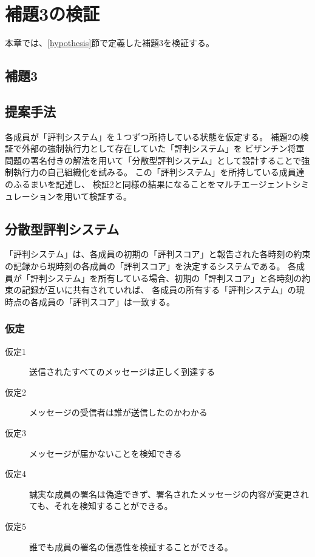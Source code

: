 \chapter{補題3の検証}
本章では、\ref{hypothesis}節で定義した補題3を検証する。

\section{補題3}
\thirdLemma

\section{提案手法}
各成員が「評判システム」を１つずつ所持している状態を仮定する。
補題2の検証で外部の強制執行力として存在していた「評判システム」を
ビザンチン将軍問題の署名付きの解法を用いて「分散型評判システム」として設計することで強制執行力の自己組織化を試みる。
この「評判システム」を所持している成員達のふるまいを記述し、
検証2と同様の結果になることをマルチエージェントシミュレーションを用いて検証する。

\section{分散型評判システム}
「評判システム」は、各成員の初期の「評判スコア」と報告された各時刻の約束の記録から現時刻の各成員の「評判スコア」を決定するシステムである。
各成員が「評判システム」を所有している場合、初期の「評判スコア」と各時刻の約束の記録が互いに共有されていれば、
各成員の所有する「評判システム」の現時点の各成員の「評判スコア」は一致する。

\subsection{仮定}
\begin{description}
  \item[仮定1] 送信されたすべてのメッセージは正しく到達する
  \item[仮定2] メッセージの受信者は誰が送信したのかわかる
  \item[仮定3] メッセージが届かないことを検知できる
  \item[仮定4] 誠実な成員の署名は偽造できず、署名されたメッセージの内容が変更されても、それを検知することができる。
  \item[仮定5] 誰でも成員の署名の信憑性を検証することができる。
\end{description}

